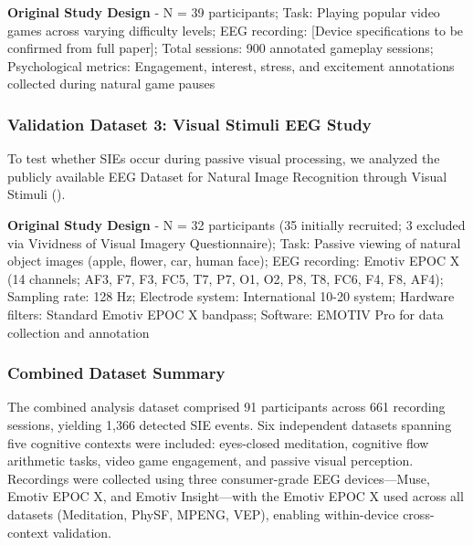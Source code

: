 \documentclass[11pt,a4paper]{article}
\begin{document}
\textbf{Original Study Design }- N = 39 participants; Task: Playing popular video games across varying difficulty levels; EEG recording: [Device specifications to be confirmed from full paper]; Total sessions: 900 annotated gameplay sessions; Psychological metrics: Engagement, interest, stress, and excitement annotations collected during natural game pauses

\subsubsection{Validation Dataset 3: Visual Stimuli EEG Study}
To test whether SIEs occur during passive visual processing, we analyzed the publicly available EEG Dataset for Natural Image Recognition through Visual Stimuli (\cite{faisal2023eeg}).

\textbf{Original Study Design } - N = 32 participants (35 initially recruited; 3 excluded via Vividness of Visual Imagery Questionnaire); Task: Passive viewing of natural object images (apple, flower, car, human face); EEG recording: Emotiv EPOC X (14 channels; AF3, F7, F3, FC5, T7, P7, O1, O2, P8, T8, FC6, F4, F8, AF4); Sampling rate: 128 Hz; Electrode system: International 10-20 system; Hardware filters: Standard Emotiv EPOC X bandpass; Software: EMOTIV Pro for data collection and annotation

\subsubsection{Combined Dataset Summary}
The combined analysis dataset comprised 91 participants across 661 recording sessions, yielding 1,366 detected SIE events. Six independent datasets spanning five cognitive contexts were included: eyes-closed meditation, cognitive flow arithmetic tasks, video game engagement, and passive visual perception. Recordings were collected using three consumer-grade EEG devices—Muse, Emotiv EPOC X, and Emotiv Insight—with the Emotiv EPOC X used across all datasets (Meditation, PhySF, MPENG, VEP), enabling within-device cross-context validation.
\end{document}

